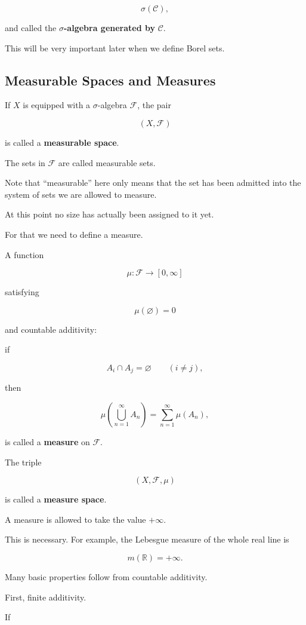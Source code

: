 \documentclass[11pt]{article}
\begin{document}
\[
\sigma(\mathcal{C}),
\]

and called the \textbf{$\sigma$-algebra generated by} $\mathcal{C}$.

This will be very important later when we define Borel sets.

\subsection{Measurable Spaces and Measures}

If $X$ is equipped with a $\sigma$-algebra $\mathcal{F}$, the pair

\[
(X,\mathcal{F})
\]

is called a \textbf{measurable space}.

The sets in $\mathcal{F}$ are called measurable sets.

Note that ``measurable'' here only means that the set has been admitted into the system of sets we are allowed to measure.

At this point no size has actually been assigned to it yet.

For that we need to define a measure.

A function

\[
\mu:\mathcal{F}\rightarrow[0,\infty]
\]

satisfying

\[
\mu(\varnothing)=0
\]

and countable additivity:

if

\[
A_{i}\cap A_{j}=\varnothing\qquad(i\ne j),
\]

then

\[
\mu\left(\bigcup_{n=1}^{\infty}A_{n}\right)=\sum_{n=1}^{\infty}\mu(A_{n}),
\]

is called a \textbf{measure} on $\mathcal{F}$.

The triple

\[
(X,\mathcal{F},\mu)
\]

is called a \textbf{measure space}.

A measure is allowed to take the value $+\infty$.

This is necessary. For example, the Lebesgue measure of the whole real line is

\[
m(\mathbb{R})=+\infty.
\]

Many basic properties follow from countable additivity.

First, finite additivity.

If
\end{document}
